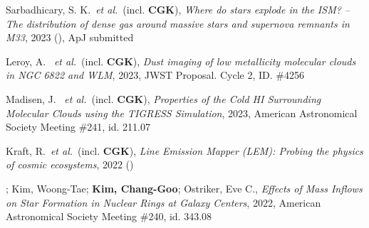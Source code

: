 \item Sarbadhicary, S. K.~\textit{et al.}~(incl. \textbf{CGK}), \textit{Where do stars explode in the ISM? -- The distribution of dense gas around massive stars and supernova remnants in M33}, 2023 (), ApJ submitted
\item Leroy, A. ~\textit{et al.}~(incl. \textbf{CGK}), \textit{Dust imaging of low metallicity molecular clouds in NGC 6822 and WLM}, 2023, JWST Proposal. Cycle 2, ID. \#4256
\item Madisen, J. ~\textit{et al.}~(incl. \textbf{CGK}), \textit{Properties of the Cold HI Surrounding Molecular Clouds using the TIGRESS Simulation}, 2023, American Astronomical Society Meeting \#241, id. 211.07
\item Kraft, R.~\textit{et al.}~(incl. \textbf{CGK}), \textit{Line Emission Mapper (LEM): Probing the physics of cosmic ecosystems}, 2022 ()
\item {}; Kim, Woong-Tae; \textbf{Kim, Chang-Goo}; Ostriker, Eve C., \textit{Effects of Mass Inflows on Star Formation in Nuclear Rings at Galaxy Centers}, 2022, American Astronomical Society Meeting \#240, id. 343.08